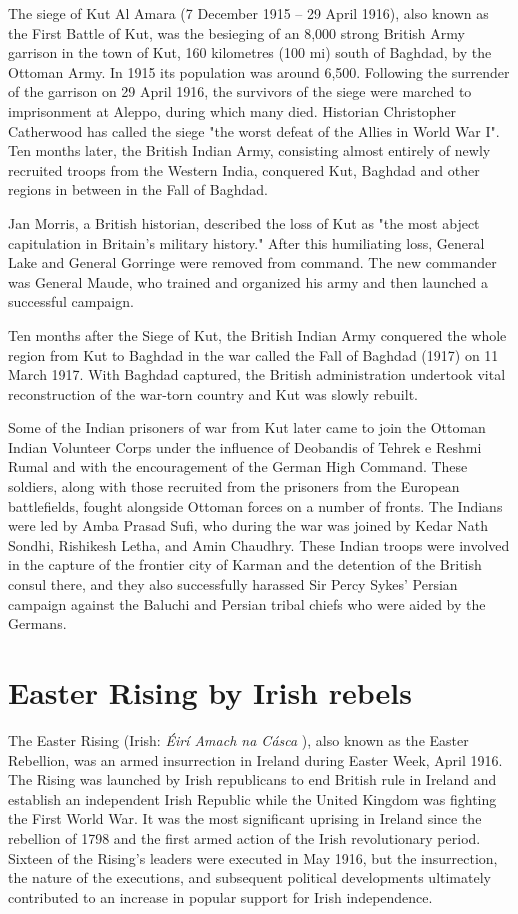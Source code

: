 \documentclass[a4paper,]{book}
\begin{document}
The siege of Kut Al Amara (7 December 1915 – 29 April 1916), also known as the First Battle of Kut, was the besieging of an 8,000 strong British Army garrison in the town of Kut, 160 kilometres (100 mi) south of Baghdad, by the Ottoman Army. In 1915 its population was around 6,500. Following the surrender of the garrison on 29 April 1916, the survivors of the siege were marched to imprisonment at Aleppo, during which many died. Historian Christopher Catherwood has called the siege "the worst defeat of the Allies in World War I". Ten months later, the British Indian Army, consisting almost entirely of newly recruited troops from the Western India, conquered Kut, Baghdad and other regions in between in the Fall of Baghdad. 

Jan Morris, a British historian, described the loss of Kut as "the most abject capitulation in Britain's military history." After this humiliating loss, General Lake and General Gorringe were removed from command. The new commander was General Maude, who trained and organized his army and then launched a successful campaign.

Ten months after the Siege of Kut, the British Indian Army conquered the whole region from Kut to Baghdad in the war called the Fall of Baghdad (1917) on 11 March 1917. With Baghdad captured, the British administration undertook vital reconstruction of the war-torn country and Kut was slowly rebuilt.

Some of the Indian prisoners of war from Kut later came to join the Ottoman Indian Volunteer Corps under the influence of Deobandis of Tehrek e Reshmi Rumal and with the encouragement of the German High Command. These soldiers, along with those recruited from the prisoners from the European battlefields, fought alongside Ottoman forces on a number of fronts. The Indians were led by Amba Prasad Sufi, who during the war was joined by Kedar Nath Sondhi, Rishikesh Letha, and Amin Chaudhry. These Indian troops were involved in the capture of the frontier city of Karman and the detention of the British consul there, and they also successfully harassed Sir Percy Sykes' Persian campaign against the Baluchi and Persian tribal chiefs who were aided by the Germans.

\section{Easter Rising by Irish rebels}

The Easter Rising (Irish: \textit{Éirí Amach na Cásca} ), also known as the Easter Rebellion, was an armed insurrection in Ireland during Easter Week, April 1916. The Rising was launched by Irish republicans to end British rule in Ireland and establish an independent Irish Republic while the United Kingdom was fighting the First World War. It was the most significant uprising in Ireland since the rebellion of 1798 and the first armed action of the Irish revolutionary period. Sixteen of the Rising's leaders were executed in May 1916, but the insurrection, the nature of the executions, and subsequent political developments ultimately contributed to an increase in popular support for Irish independence.
\end{document}
